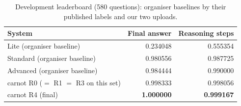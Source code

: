 \documentclass[conference]{IEEEtran}
\begin{document}
\begin{table}[t]
\caption{Development leaderboard (580 questions): organiser baselines by their published labels and our two uploads.}
\label{tab:baselines}
\centering
\scriptsize
\begin{tabular}{@{}lrr@{}}
\toprule
System & Final answer & Reasoning steps \\
\midrule
Lite (organiser baseline) & 0.234048 & 0.555354 \\
Standard (organiser baseline) & 0.980556 & 0.987725 \\
Advanced (organiser baseline) & 0.984444 & 0.990000 \\
carnot R0 ($=$ R1 $=$ R3 on this set) & 0.998333 & 0.998056 \\
carnot R4 (final) & \textbf{1.000000} & \textbf{0.999167} \\
\bottomrule
\end{tabular}
\end{table}
\end{document}
